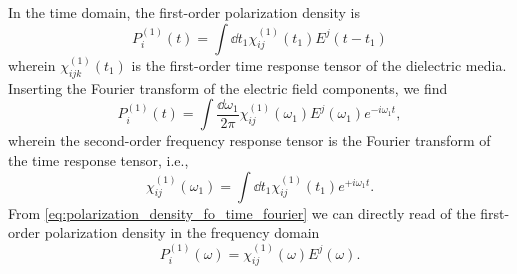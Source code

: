 In the time domain, the first-order polarization density is~\cite[p.~17]{Murti2014}
\begin{equation}
	P_i^{(1)}(t)
	=
	\int\dd{t_1}
	\chi^{(1)}_{ij}(t_1)
	E^j(t-t_1)
	\label{eq:polarization_density_fo_time}
\end{equation}
wherein $\chi^{(1)}_{ijk}(t_1)$ is the first-order time response tensor of the dielectric media.
Inserting the Fourier transform of the electric field components, we find
\begin{equation}
	P_i^{(1)}(t)
	=
	\int\frac{\dd{\omega_1}}{2\pi}
	\chi^{(1)}_{ij}(\omega_1)
	E^j(\omega_1)
	e^{-i\omega_1t}
	\label{eq:polarization_density_fo_time_fourier}
	,
\end{equation}
wherein the second-order frequency response tensor is the Fourier transform of the time response tensor, i.e.,
\begin{equation}
	\chi^{(1)}_{ij}(\omega_1)
	=
	\int\dd{t_1}
	\chi^{(1)}_{ij}(t_1)
	e^{+i\omega_1t}
	.
\end{equation}
From \cref{eq:polarization_density_fo_time_fourier} we can directly read of the first-order polarization density in the frequency domain
\begin{equation}
	P_i^{(1)}(\omega)
	=
	\chi^{(1)}_{ij}(\omega)
	E^j(\omega)
	.
	\label{eq:polarization_density_fo_freq}
\end{equation}

